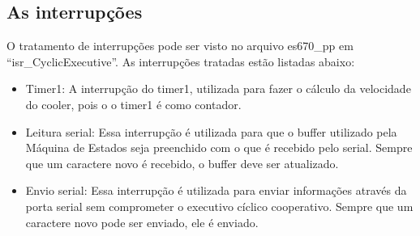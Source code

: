 \documentclass{article}
\begin{document}
\subsection{As interrupções}
O tratamento de interrupções pode ser visto no arquivo es670\_pp em ``isr\_CyclicExecutive''. As interrupções tratadas estão listadas abaixo:
\begin{itemize}
\item Timer1: A interrupção do timer1, utilizada para fazer o cálculo da velocidade do cooler, pois o o timer1 é como contador.
\item Leitura serial: Essa interrupção é utilizada para que o buffer utilizado pela Máquina de Estados seja preenchido com o que é recebido pelo serial. Sempre que um caractere novo é recebido, o buffer deve ser atualizado.
\item Envio serial: Essa interrupção é utilizada para enviar informações através da porta serial sem comprometer o executivo cíclico cooperativo. Sempre que um caractere novo pode ser enviado, ele é enviado.
\end{itemize}
\end{document}
